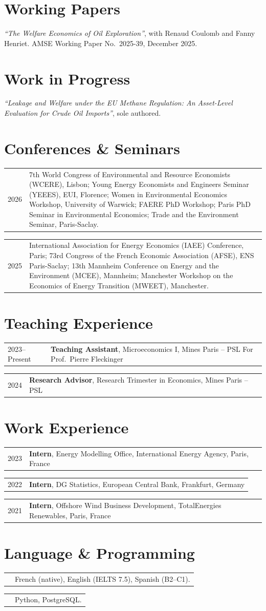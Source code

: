 \documentclass[11pt]{article}
\makeatletter
\newcommand{\cvrow}[2]{%
  \begin{tabularx}{\textwidth}{@{}p{2.3cm}@{\hspace{0.35cm}}X@{}}
    #1 & #2
  \end{tabularx}\par\vspace{5pt}%
}
\makeatother
\begin{document}
\section{Working Papers}
\textit{``The Welfare Economics of Oil Exploration''}, with Renaud Coulomb and Fanny Henriet.
AMSE Working Paper No.\ 2025-39, December 2025.

\vspace{5pt}

\section{Work in Progress}
\textit{``Leakage and Welfare under the EU Methane Regulation: An Asset-Level Evaluation
for Crude Oil Imports''}, sole authored.

\vspace{5pt}

\section{Conferences \& Seminars}
\cvrow{2026}{7th World Congress of Environmental and Resource Economists (WCERE), Lisbon;
  Young Energy Economists and Engineers Seminar (YEEES), EUI, Florence;
  Women in Environmental Economics Workshop, University of Warwick;
  FAERE PhD Workshop; Paris PhD Seminar in Environmental Economics;
  Trade and the Environment Seminar, Paris-Saclay.}
\cvrow{2025}{International Association for Energy Economics (IAEE) Conference, Paris;
  73rd Congress of the French Economic Association (AFSE), ENS Paris-Saclay;
  13th Mannheim Conference on Energy and the Environment (MCEE), Mannheim;
  Manchester Workshop on the Economics of Energy Transition (MWEET), Manchester.}

\section{Teaching Experience}
\cvrow{2023--Present}{\textbf{Teaching Assistant}, Microeconomics I, Mines Paris -- PSL\newline
  For Prof.\ Pierre Fleckinger}
\cvrow{2024}{\textbf{Research Advisor}, Research Trimester in Economics, Mines Paris -- PSL}

\section{Work Experience}
\cvrow{2023}{\textbf{Intern}, Energy Modelling Office, International Energy Agency, Paris, France}
\cvrow{2022}{\textbf{Intern}, DG Statistics, European Central Bank, Frankfurt, Germany}
\cvrow{2021}{\textbf{Intern}, Offshore Wind Business Development, TotalEnergies Renewables, Paris, France}

\section{Language \& Programming}
\cvrow{}{French (native), English (IELTS 7.5), Spanish (B2--C1).}
\cvrow{}{Python, PostgreSQL.}
\end{document}
